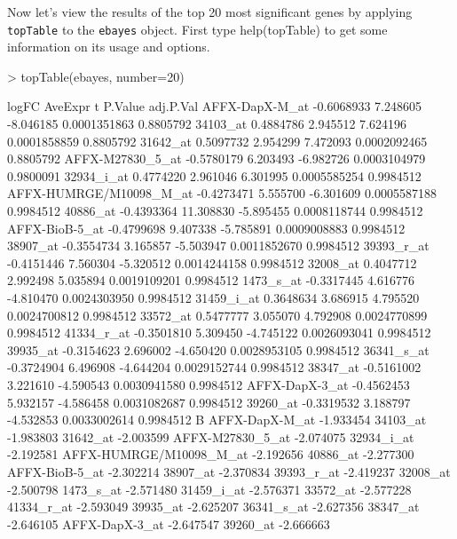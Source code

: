 \documentclass[12pt]{article}
\newcommand{\code}[1]{{\texttt{#1}}}
\begin{document}
Now let's view the results of the top 20 most significant genes by applying \code{topTable} to the \code{ebayes} object.  First type help(topTable) to get some information on its usage and options.

\begin{Schunk}
\begin{Sinput}
> topTable(ebayes, number=20)
\end{Sinput}
\begin{Soutput}
                             logFC   AveExpr         t      P.Value adj.P.Val
AFFX-DapX-M_at          -0.6068933  7.248605 -8.046185 0.0001351863 0.8805792
34103_at                 0.4884786  2.945512  7.624196 0.0001858859 0.8805792
31642_at                 0.5097732  2.954299  7.472093 0.0002092465 0.8805792
AFFX-M27830_5_at        -0.5780179  6.203493 -6.982726 0.0003104979 0.9800091
32934_i_at               0.4774220  2.961046  6.301995 0.0005585254 0.9984512
AFFX-HUMRGE/M10098_M_at -0.4273471  5.555700 -6.301609 0.0005587188 0.9984512
40886_at                -0.4393364 11.308830 -5.895455 0.0008118744 0.9984512
AFFX-BioB-5_at          -0.4799698  9.407338 -5.785891 0.0009008883 0.9984512
38907_at                -0.3554734  3.165857 -5.503947 0.0011852670 0.9984512
39393_r_at              -0.4151446  7.560304 -5.320512 0.0014244158 0.9984512
32008_at                 0.4047712  2.992498  5.035894 0.0019109201 0.9984512
1473_s_at               -0.3317445  4.616776 -4.810470 0.0024303950 0.9984512
31459_i_at               0.3648634  3.686915  4.795520 0.0024700812 0.9984512
33572_at                 0.5477777  3.055070  4.792908 0.0024770899 0.9984512
41334_r_at              -0.3501810  5.309450 -4.745122 0.0026093041 0.9984512
39935_at                -0.3154623  2.696002 -4.650420 0.0028953105 0.9984512
36341_s_at              -0.3724904  6.496908 -4.644204 0.0029152744 0.9984512
38347_at                -0.5161002  3.221610 -4.590543 0.0030941580 0.9984512
AFFX-DapX-3_at          -0.4562453  5.932157 -4.586458 0.0031082687 0.9984512
39260_at                -0.3319532  3.188797 -4.532853 0.0033002614 0.9984512
                                B
AFFX-DapX-M_at          -1.933454
34103_at                -1.983803
31642_at                -2.003599
AFFX-M27830_5_at        -2.074075
32934_i_at              -2.192581
AFFX-HUMRGE/M10098_M_at -2.192656
40886_at                -2.277300
AFFX-BioB-5_at          -2.302214
38907_at                -2.370834
39393_r_at              -2.419237
32008_at                -2.500798
1473_s_at               -2.571480
31459_i_at              -2.576371
33572_at                -2.577228
41334_r_at              -2.593049
39935_at                -2.625207
36341_s_at              -2.627356
38347_at                -2.646105
AFFX-DapX-3_at          -2.647547
39260_at                -2.666663
\end{Soutput}
\end{Schunk}
\end{document}
